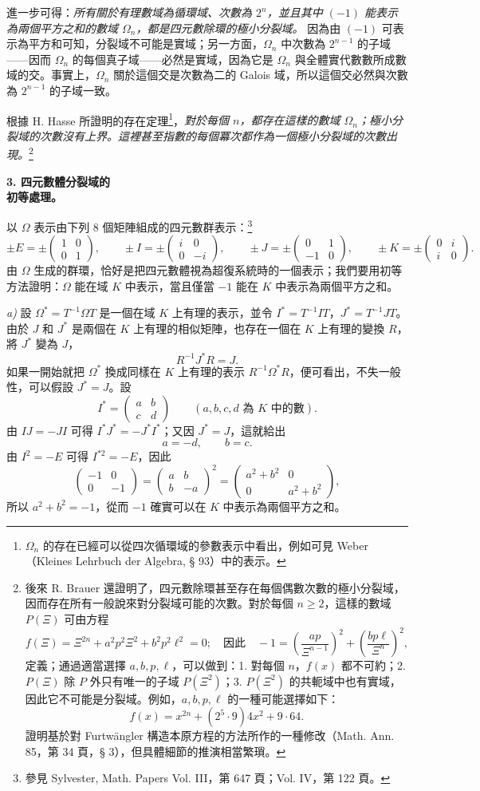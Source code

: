 \documentclass[11pt]{article}
\providecommand{\srcspaced}[1]{\emph{#1}}
\providecommand{\mat}[1]{\begin{pmatrix}#1\end{pmatrix}}
\begin{document}
進一步可得：\srcspaced{所有關於有理數域為循環域、次數為 $2^n$，並且其中 $(-1)$ 能表示為兩個平方之和的數域 $\Omega_n$，都是四元數除環的極小分裂域。} 因為由 $(-1)$ 可表示為平方和可知，分裂域不可能是實域；另一方面，$\Omega_n$ 中次數為 $2^{n-1}$ 的子域——因而 $\Omega_n$ 的每個真子域——必然是實域，因為它是 $\Omega_n$ 與全體實代數數所成數域的交。事實上，$\Omega_n$ 關於這個交是次數為二的 Galois 域，所以這個交必然與次數為 $2^{n-1}$ 的子域一致。

根據 H. Hasse 所證明的存在定理\footnote{$\Omega_n$ 的存在已經可以從四次循環域的參數表示中看出，例如可見 Weber（Kleines Lehrbuch der Algebra, § 93）中的表示。}，\srcspaced{對於每個 $n$，都存在這樣的數域 $\Omega_n$；極小分裂域的次數沒有上界。這裡甚至指數的每個冪次都作為一個極小分裂域的次數出現。}\footnote{後來 R. Brauer 還證明了，四元數除環甚至存在每個偶數次數的極小分裂域，因而存在所有一般說來對分裂域可能的次數。對於每個 $n\ge2$，這樣的數域 $P(\Xi)$ 可由方程
\[
 f(\Xi)=\Xi^{2n}+a^2p^2\Xi^2+b^2p^2\ell^2=0;
\quad \text{因此}\quad -1=\left(\frac{ap}{\Xi^{n-1}}\right)^2+
        \left(\frac{bp\ell}{\Xi^n}\right)^2,
\]
定義；通過適當選擇 $a,b,p,\ell$，可以做到：1. 對每個 $n$，$f(x)$ 都不可約；2. $P(\Xi)$ 除 $P$ 外只有唯一的子域 $P(\Xi^2)$；3. $P(\Xi^2)$ 的共軛域中也有實域，因此它不可能是分裂域。例如，$a,b,p,\ell$ 的一種可能選擇如下：
\[
        f(x)=x^{2n}+(2^5\cdot9)4x^2+9\cdot64.
\]
證明基於對 Furtwängler 構造本原方程的方法所作的一種修改（Math. Ann. 85，第 34 頁，§ 3），但具體細節的推演相當繁瑣。}
\begin{center}
\textbf{3. 四元數體分裂域的\\
初等處理。}
\end{center}

以 $\Omega$ 表示由下列 8 個矩陣組成的四元數群表示：\footnote{參見 Sylvester, Math. Papers Vol. III，第 647 頁；Vol. IV，第 122 頁。}
\[
\pm E=\pm\mat{1&0\\0&1},\qquad
\pm I=\pm\mat{i&0\\0&-i},\qquad
\pm J=\pm\mat{0&1\\-1&0},\qquad
\pm K=\pm\mat{0&i\\ i&0}.
\]
由 $\Omega$ 生成的群環，恰好是把四元數體視為超復系統時的一個表示；我們要用初等方法證明：$\Omega$ 能在域 $K$ 中表示，當且僅當 $-1$ 能在 $K$ 中表示為兩個平方之和。

\emph{a)} 設 $\Omega^*=T^{-1}\Omega T$ 是一個在域 $K$ 上有理的表示，並令 $I^*=T^{-1}IT$，$J^*=T^{-1}JT$。由於 $J$ 和 $J^*$ 是兩個在 $K$ 上有理的相似矩陣，也存在一個在 $K$ 上有理的變換 $R$，將 $J^*$ 變為 $J$，
\[
        R^{-1}J^*R=J.
\]
如果一開始就把 $\Omega^*$ 換成同樣在 $K$ 上有理的表示 $R^{-1}\Omega^*R$，便可看出，不失一般性，可以假設 $J^*=J$。設
\[
        I^*=\mat{a&b\\ c&d}\qquad (a,b,c,d\text{ 為 }K\text{ 中的數}).
\]
由 $IJ=-JI$ 可得 $I^*J^*=-J^*I^*$；又因 $J^*=J$，這就給出
\[
        a=-d,
        \qquad b=c.
\]
由 $I^2=-E$ 可得 $I^{*2}=-E$，因此
\[
        \mat{-1&0\\0&-1}=\mat{a&b\\ b&-a}^2
        =\mat{a^2+b^2&0\\0&a^2+b^2},
\]
所以 $a^2+b^2=-1$，從而 $-1$ 確實可以在 $K$ 中表示為兩個平方之和。
\end{document}
